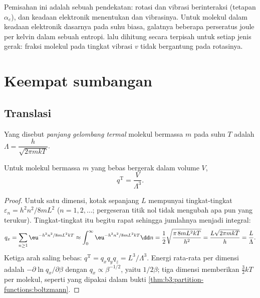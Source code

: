 Pemisahan ini adalah sebuah pendekatan: rotasi dan vibrasi berinteraksi
(tetapan $\alpha_e$), dan keadaan elektronik menentukan  dan
vibrasinya. Untuk molekul dalam keadaan elektronik dasarnya pada suhu biasa,
galatnya beberapa perseratus joule per kelvin dalam sebuah entropi. 
lalu dihitung secara terpisah untuk setiap jenis gerak: fraksi molekul pada
tingkat vibrasi $v$ tidak bergantung pada rotasinya.

\section{Keempat sumbangan}

\subsection*{Translasi}

\begin{definition}\label{def:b3:partition-functions:thermal-wavelength}
Yang disebut \emph{panjang gelombang termal}
molekul bermassa $m$ pada suhu $T$ adalah $\Lambda = \dfrac{h}{\sqrt{2\pi mkT}}$.
\end{definition}

\begin{proposition}\label{prop:b3:partition-functions:q-trans}
Untuk molekul bermassa $m$ yang bebas bergerak dalam volume $V$,
\[
  q^{\mathrm T} = \frac{V}{\Lambda^3}.
\]
\end{proposition}

\begin{proof}
Untuk satu dimensi, kotak sepanjang $L$ mempunyai tingkat-tingkat
$\varepsilon_n = h^2n^2/8mL^2$ ($n = 1, 2, \dots$; pergeseran titik nol tidak
mengubah apa pun yang terukur). Tingkat-tingkat itu begitu rapat sehingga
jumlahnya menjadi integral:
\[
  q_x = \sum_{n\ge1}\eu^{-h^2n^2/8mL^2kT} \approx \int_0^\infty\eu^{-h^2n^2/8mL^2kT}\dd n
      = \frac12\sqrt{\frac{\pi\,8mL^2kT}{h^2}} = \frac{L\sqrt{2\pi mkT}}{h} = \frac{L}{\Lambda}.
\]
Ketiga arah saling bebas: $q^{\mathrm T} = q_xq_yq_z = L^3/\Lambda^3$. Energi
rata-rata per dimensi adalah $-\partial\ln q_x/\partial\beta$ dengan
$q_x \propto \beta^{-1/2}$, yaitu $1/2\beta$; tiga dimensi memberikan $\frac32kT$
per molekul, seperti yang dipakai dalam bukti
\cref{thm:b3:partition-functions:boltzmann}.
\end{proof}

